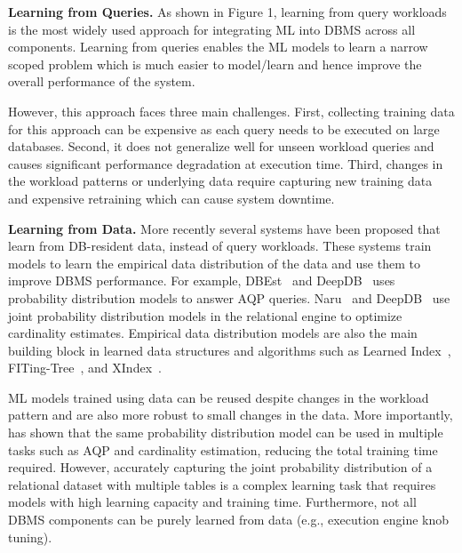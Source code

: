 \vspace{2mm}
\noindent \textbf{Learning from Queries.} As shown in Figure 1, learning from query workloads is the most widely used approach for integrating ML into DBMS across all components.
Learning from queries enables the ML models to learn a narrow scoped problem which is much easier to model/learn and hence improve the overall performance of the system.

However, this approach faces three main challenges.
First, collecting training data for this approach can be expensive as each query needs to be executed on large databases.
Second, it does not generalize well for unseen workload queries and causes significant performance degradation at execution time.
Third, changes in the workload patterns or underlying data require capturing new training data and expensive retraining which can cause system downtime.

\vspace{2mm}
\noindent \textbf{Learning from Data.} More recently several systems have been proposed that learn from DB-resident data, instead of query workloads.
These systems train models to learn the empirical data distribution of the data and use them to improve DBMS performance.
For example, DBEst~\cite{dbest} and DeepDB~\cite{deepdb} uses probability distribution models to answer AQP queries.
Naru~\cite{naru} and DeepDB~\cite{deepdb} use joint probability distribution models in the relational engine to optimize cardinality estimates.
Empirical data distribution models are also the main building block in learned data structures and algorithms such as Learned Index~\cite{learnedindex}, FITing-Tree~\cite{fitingtree}, and XIndex~\cite{xindex}.

ML models trained using data can be reused despite changes in the workload pattern and are also more robust to small changes in the data.
More importantly, \cite{deepdb} has shown that the same probability distribution model can be used in multiple tasks such as AQP and cardinality estimation, reducing the total training time required.
However, accurately capturing the joint probability distribution of a relational dataset with multiple tables is a complex learning task that requires models with high learning capacity and training time.
Furthermore, not all DBMS components can be purely learned from data (e.g., execution engine knob tuning).

